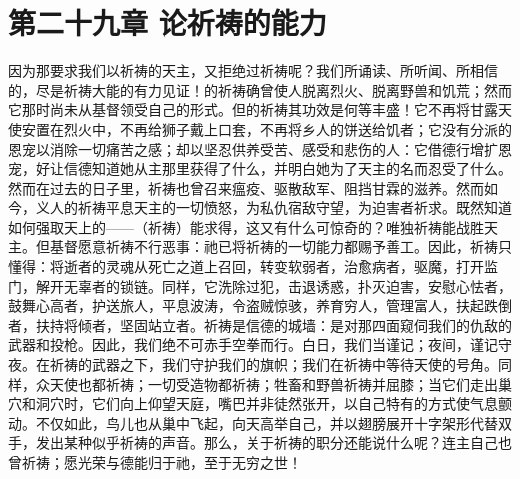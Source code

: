 \section{第二十九章  论祈祷的能力}

因为那要求我们以祈祷的天主，又拒绝过祈祷呢？我们所诵读、所听闻、所相信的，尽是祈祷大能的有力见证！的祈祷确曾使人脱离烈火、脱离野兽和饥荒；然而它那时尚未从基督领受自己的形式。但的祈祷其功效是何等丰盛！它不再将甘露天使安置在烈火中，不再给狮子戴上口套，不再将乡人的饼送给饥者；它没有分派的恩宠以消除一切痛苦之感；却以坚忍供养受苦、感受和悲伤的人：它借德行增扩恩宠，好让信德知道她从主那里获得了什么，并明白她为了天主的名而忍受了什么。然而在过去的日子里，祈祷也曾召来瘟疫、驱散敌军、阻挡甘霖的滋养。然而如今，义人的祈祷平息天主的一切愤怒，为私仇宿敌守望，为迫害者祈求。既然知道如何强取天上的——（祈祷）能求得，这又有什么可惊奇的？唯独祈祷能战胜天主。但基督愿意祈祷不行恶事：祂已将祈祷的一切能力都赐予善工。因此，祈祷只懂得：将逝者的灵魂从死亡之道上召回，转变软弱者，治愈病者，驱魔，打开监门，解开无辜者的锁链。同样，它洗除过犯，击退诱惑，扑灭迫害，安慰心怯者，鼓舞心高者，护送旅人，平息波涛，令盗贼惊骇，养育穷人，管理富人，扶起跌倒者，扶持将倾者，坚固站立者。祈祷是信德的城墙：是对那四面窥伺我们的仇敌的武器和投枪。因此，我们绝不可赤手空拳而行。白日，我们当谨记；夜间，谨记守夜。在祈祷的武器之下，我们守护我们的旗帜；我们在祈祷中等待天使的号角。同样，众天使也都祈祷；一切受造物都祈祷；牲畜和野兽祈祷并屈膝；当它们走出巢穴和洞穴时，它们向上仰望天庭，嘴巴并非徒然张开，以自己特有的方式使气息颤动。不仅如此，鸟儿也从巢中飞起，向天高举自己，并以翅膀展开十字架形代替双手，发出某种似乎祈祷的声音。那么，关于祈祷的职分还能说什么呢？连主自己也曾祈祷；愿光荣与德能归于祂，至于无穷之世！\par

